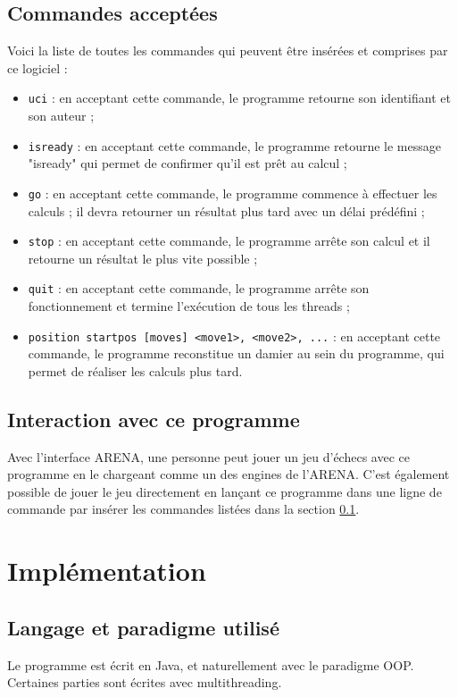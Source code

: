 \documentclass{article}
\begin{document}
\subsection{Commandes acceptées} \label{commandes}
\par Voici la liste de toutes les commandes qui peuvent être insérées et comprises par ce logiciel :
\begin{itemize}
    \item \texttt{uci} : en acceptant cette commande, le programme retourne son identifiant et son auteur ;
    \item \texttt{isready} : en acceptant cette commande, le programme retourne le message "isready" qui permet de confirmer qu'il est prêt au calcul ;
    \item \texttt{go} : en acceptant cette commande, le programme commence à effectuer les calculs ; il devra retourner un résultat plus tard avec un délai prédéfini ;
    \item \texttt{stop} : en acceptant cette commande, le programme arrête son calcul et il retourne un résultat le plus vite possible ;
    \item \texttt{quit} : en acceptant cette commande, le programme arrête son fonctionnement et termine l'exécution de tous les threads ;
    \item \texttt{position startpos [moves] <move1>, <move2>, ...} : en acceptant cette commande, le programme reconstitue un damier au sein du programme, qui permet de réaliser les calculs plus tard.
\end{itemize}

\subsection{Interaction avec ce programme}
\par Avec l'interface ARENA, une personne peut jouer un jeu d'échecs avec ce programme en le chargeant comme un des engines de l'ARENA. C'est également possible de jouer le jeu directement en lançant ce programme dans une ligne de commande par insérer les commandes listées dans la section \ref{commandes}.


\section{Implémentation}

\subsection{Langage et paradigme utilisé}
\par Le programme est écrit en Java, et naturellement avec le paradigme OOP. Certaines parties sont écrites avec multithreading.
\end{document}
